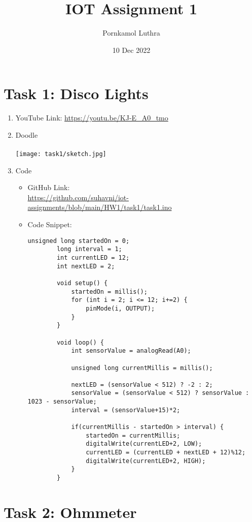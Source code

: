 \documentclass[12pt]{article}
\title{IOT Assignment 1}
\author{Pornkamol Luthra}
\date{10 Dec 2022}
\begin{document}
\maketitle

\section*{Task 1: Disco Lights}

\begin{enumerate}
	\item YouTube Link: \href{https://youtu.be/KJ-E_A0_tmo}{https://youtu.be/KJ-E\_A0\_tmo}
	\item Doodle \\\\
		\texttt{[image: task1/sketch.jpg]}
	\item Code
		\begin{itemize}
			\item GitHub Link:\\ 
				\href{https://github.com/suhavni/iot-assignments/blob/main/HW1/task1/task1.ino}{https://github.com/suhavni/iot-assignments/blob/main/HW1/task1/task1.ino}
			\item Code Snippet:
				\begin{lstlisting}[language=Arduino]
		unsigned long startedOn = 0;
		long interval = 1;
		int currentLED = 12;
		int nextLED = 2;

		void setup() {
			startedOn = millis();
			for (int i = 2; i <= 12; i+=2) {
				pinMode(i, OUTPUT);
			}
		}

		void loop() {
			int sensorValue = analogRead(A0);
			
			unsigned long currentMillis = millis();

			nextLED = (sensorValue < 512) ? -2 : 2;
			sensorValue = (sensorValue < 512) ? sensorValue : 1023 - sensorValue;
			interval = (sensorValue+15)*2;
			
			if(currentMillis - startedOn > interval) {
				startedOn = currentMillis;
				digitalWrite(currentLED+2, LOW);
				currentLED = (currentLED + nextLED + 12)%12;
				digitalWrite(currentLED+2, HIGH);
			}
		}
				\end{lstlisting}
	\end{itemize}
\end{enumerate}

\section*{Task 2: Ohmmeter}
\end{document}

